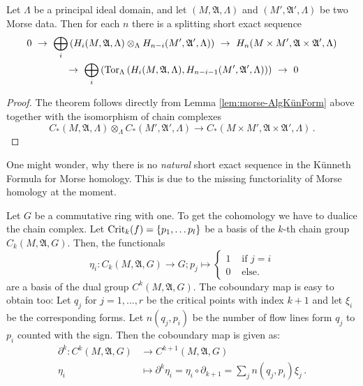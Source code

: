 \begin{theorem}
	Let $\Lambda$ be a principal ideal domain, and let $(M,\mathfrak{A},\Lambda)$ and $(M',\mathfrak{A}',\Lambda)$ be two Morse data. Then for each $n$ there is a splitting short exact sequence 
	\begin{multline*}
		0~\to ~
		\bigoplus_i\left(H_i(M,\mathfrak{A},\Lambda)\otimes_\Lambda H_{n-i}(M',\mathfrak{A}',\Lambda)\right) ~\to~
			H_n(M\times M',\mathfrak{A}\times \mathfrak{A}',\Lambda) \\
		~	\to ~
			\bigoplus_i\left(\operatorname{\mathrm{Tor}}_{\Lambda}\left(
			H_i(M,\mathfrak{A},\Lambda),H_{n-i-1}(M',\mathfrak{A}',\Lambda)
			\right) \right)~ \to ~0
	\end{multline*}
\end{theorem}
\begin{proof}
	The theorem follows directly from Lemma \ref{lem:morse-AlgKünForm} above together with the isomorphism of chain complexes 
	\begin{equation*}
		C_*(M,\mathfrak{A},\Lambda)\otimes_\Lambda C_*(M',\mathfrak{A}',\Lambda) \to C_*(M\times M',\mathfrak{A}\times \mathfrak{A}',\Lambda) \,.
	\end{equation*}
\end{proof}
\begin{remark}
	One might wonder, why there is no \textit{natural} short exact sequence in the Künneth Formula for Morse homology. This is due to the missing functoriality of Morse homology at the moment.
\end{remark}

\begin{definition}
Let $G$ be a commutative ring with one. To get the cohomology we have to dualice the chain complex. Let $\mathrm{Crit}_k(f)=\{p_1,\dots p_l\}$ be a basis of the $k$-th chain group $C_k(M,\mathfrak{A},G)$. Then, the functionals
\begin{equation*}
	\eta_i:C_k(M,\mathfrak{A},G) \to G; p_j \mapsto \begin{cases*}
		1 & \text{ if } j=i\\
		0 & \text{ else.}
	\end{cases*}
\end{equation*} 
are a basis of the dual group $C^k(M,\mathfrak{A},G)$. The coboundary map is easy to obtain too: Let $q_j$ for $j=1,\dots,r$ be the critical points with index $k+1$ and let $\xi_i$ be the corresponding forms. Let $n(q_j,p_i)$ be the number of flow lines form $q_j$ to $p_i$ counted with the sign. Then the coboundary map is given as:
\begin{align*}
	\partial^k:C^k(M,\mathfrak{A},G) & \to C^{k+1}(M,\mathfrak{A},G)\\
	\eta_i &\mapsto \partial^{k}\eta_i=\eta_i\circ \partial_{k+1}=\sum_j n(q_j,p_i) \xi_j \,.
\end{align*}
\end{definition}

